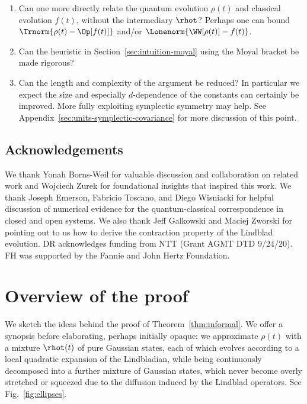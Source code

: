 \documentclass{article}
\numberwithin{equation}{section}
\begin{document}
\begin{enumerate}
    \item  Can one more directly relate the quantum evolution $\rho(t)$ and classical evolution $f(t)$, without the intermediary $\rhot$? Perhaps one can bound $\Trnorm{\rho(t)-\Op[f(t)]}$ and/or $\Lonenorm{\WW[\rho(t)]-f(t)}$.
    \item Can the heuristic in Section~\ref{sec:intuition-moyal} using the Moyal bracket be made rigorous?  
    \item  Can the length and complexity of the argument be reduced?  In particular we expect the size and especially $d$-dependence of the constants can certainly be improved. More fully exploiting symplectic symmetry may help.  See Appendix~\ref{sec:units-symplectic-covariance} for more discussion of this point.
\end{enumerate}









\subsection{Acknowledgements}
We thank Yonah Borns-Weil for valuable discussion and collaboration on related work and Wojciech Zurek for foundational insights that inspired this work. We thank Joseph Emerson, Fabricio Toscano, and Diego Wisniacki for helpful discussion of numerical evidence for the quantum-classical correspondence in closed and open systems.  
We also thank Jeff Galkowski and Maciej Zworski for pointing out to us how to derive the contraction property of the Lindblad evolution.
DR acknowledges funding from NTT (Grant AGMT DTD 9/24/20).  FH was supported by the Fannie and John Hertz Foundation.


\section{Overview of the proof}
\label{sec:pf-overview}


We sketch the ideas behind the proof of Theorem~\ref{thm:informal}.  We offer a synopsis before elaborating, perhaps initially opaque: we approximate $\rho(t)$ with a mixture $\rhot(t)$ of pure Gaussian states, each of which evolves according to a local quadratic expansion of the Lindbladian, while being continuously decomposed into a further mixture of Gaussian states, which never become overly stretched or squeezed due to the diffusion induced by the Lindblad operators.  See Fig.~\ref{fig:ellipses}. 
\end{document}
